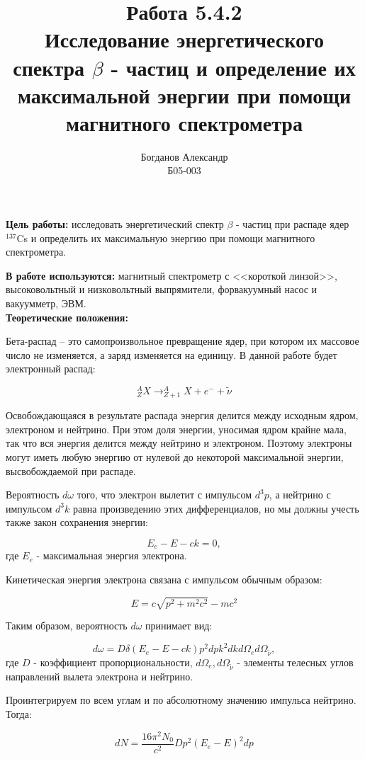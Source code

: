 \documentclass[a4paper, 12pt]{article}%
\author{Богданов Александр \\
	Б05-003}
\title{\textbf{Работа 5.4.2 \\ 
		Исследование энергетического спектра $\beta$ - частиц и определение их максимальной энергии при помощи магнитного спектрометра}}
\begin{document}
\maketitle

\textbf{Цель работы:} исследовать энергетический спектр $\beta$ - частиц при распаде ядер $^{137}$Cs и определить их максимальную энергию при помощи магнитного спектрометра.

\textbf{В работе используются:} магнитный спектрометр с <<короткой линзой>>, высоковольтный и низковольтный выпрямители,  форвакуумный насос и вакуумметр, ЭВМ.\\

\textbf{Теоретические положения:}\\\par

	Бета-распад --  это самопроизвольное превращение ядер,  при котором их массовое число не изменяется,  а заряд изменяется на единицу.  В данной работе будет электронный распад:

\[_{Z}^{A}X \rightarrow _{Z+1}^{A}X + e^{-} + \widetilde{\nu}\]

	Освобождающаяся в результате распада энергия делится между исходным ядром,  электроном и нейтрино.  При этом доля энергии,  уносимая ядром крайне мала,  так что вся энергия делится между нейтрино и электроном. Поэтому электроны могут иметь любую энергию от нулевой до некоторой максимальной энергии,  высвобождаемой при распаде.
		
	Вероятность $d\omega$ того,  что электрон вылетит с импульсом $d^3 p$,  а нейтрино с импульсом $d^3 k$ равна произведению этих дифференциалов,  но мы должны учесть также закон сохранения энергии:

\[E_e - E - ck = 0,  \]
где $E_e$ - максимальная энергия электрона.

	Кинетическая энергия электрона связана с импульсом обычным образом:
	
\[E = c \sqrt{p^2 + m^2c^2} - mc^2\]

	Таким образом,  вероятность $d \omega$ принимает вид:

\[d\omega = D \delta(E_e - E - ck) p^2 dp k^2 dk d\Omega_e d\Omega_{\widetilde{\nu}},  \]
где $D$ - коэффициент пропорциональности,  $d\Omega_e,  d\Omega_{\widetilde{\nu}}$ - элементы телесных углов направлений вылета электрона и нейтрино.

	Проинтегрируем по всем углам и по абсолютному значению импульса нейтрино. Тогда:

\[dN = \frac{16 \pi^2 N_0}{c^2} D p^2 \left(E_e - E \right)^2 dp\]
\end{document}
